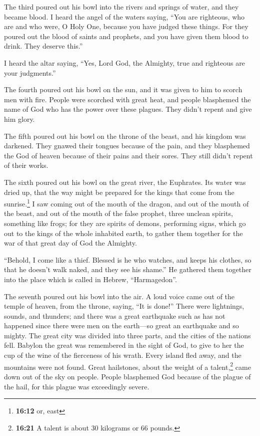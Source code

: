 The third poured out his bowl into the rivers and springs
of water, and they became blood.  I heard the angel of the
waters saying, ``You are righteous, who are and who were, O Holy One,
because you have judged these things.  For they poured out
the blood of saints and prophets, and you have given them blood to
drink. They deserve this.''

 I heard the altar saying, ``Yes, Lord God, the Almighty,
true and righteous are your judgments.''

 The fourth poured out his bowl on the sun, and it was
given to him to scorch men with fire.  People were
scorched with great heat, and people blasphemed the name of God who has
the power over these plagues. They didn't repent and give him glory.

 The fifth poured out his bowl on the throne of the
beast, and his kingdom was darkened. They gnawed their tongues because
of the pain,  and they blasphemed the God of heaven
because of their pains and their sores. They still didn't repent of
their works.

 The sixth poured out his bowl on the great river, the
Euphrates. Its water was dried up, that the way might be prepared for
the kings that come from the sunrise.\footnote{\textbf{16:12} or, east}
 I saw coming out of the mouth of the dragon, and out of
the mouth of the beast, and out of the mouth of the false prophet, three
unclean spirits, something like frogs;  for they are
spirits of demons, performing signs, which go out to the kings of the
whole inhabited earth, to gather them together for the war of that great
day of God the Almighty.

 ``Behold, I come like a thief. Blessed is he who
watches, and keeps his clothes, so that he doesn't walk naked, and they
see his shame.''  He gathered them together into the
place which is called in Hebrew, ``Harmagedon''.

 The seventh poured out his bowl into the air. A loud
voice came out of the temple of heaven, from the throne, saying, ``It is
done!''  There were lightnings, sounds, and thunders; and
there was a great earthquake such as has not happened since there were
men on the earth---so great an earthquake and so mighty. 
The great city was divided into three parts, and the cities of the
nations fell. Babylon the great was remembered in the sight of God, to
give to her the cup of the wine of the fierceness of his wrath.
 Every island fled away, and the mountains were not
found.  Great hailstones, about the weight of a
talent,\footnote{\textbf{16:21} A talent is about 30 kilograms or 66
  pounds.} came down out of the sky on people. People blasphemed God
because of the plague of the hail, for this plague was exceedingly
severe.

